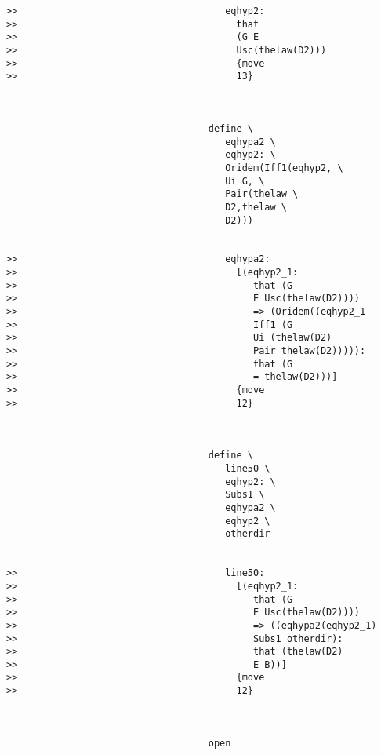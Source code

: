\documentclass[12pt]{article}
\begin{document}
\begin{verbatim}
>>                                     eqhyp2:
>>                                       that
>>                                       (G E
>>                                       Usc(thelaw(D2)))
>>                                       {move
>>                                       13}



                                    define \
                                       eqhypa2 \
                                       eqhyp2: \
                                       Oridem(Iff1(eqhyp2, \
                                       Ui G, \
                                       Pair(thelaw \
                                       D2,thelaw \
                                       D2)))


>>                                     eqhypa2:
>>                                       [(eqhyp2_1:
>>                                          that (G
>>                                          E Usc(thelaw(D2))))
>>                                          => (Oridem((eqhyp2_1
>>                                          Iff1 (G
>>                                          Ui (thelaw(D2)
>>                                          Pair thelaw(D2))))):
>>                                          that (G
>>                                          = thelaw(D2)))]
>>                                       {move
>>                                       12}



                                    define \
                                       line50 \
                                       eqhyp2: \
                                       Subs1 \
                                       eqhypa2 \
                                       eqhyp2 \
                                       otherdir


>>                                     line50:
>>                                       [(eqhyp2_1:
>>                                          that (G
>>                                          E Usc(thelaw(D2))))
>>                                          => ((eqhypa2(eqhyp2_1)
>>                                          Subs1 otherdir):
>>                                          that (thelaw(D2)
>>                                          E B))]
>>                                       {move
>>                                       12}



                                    open



\end{verbatim}
\end{document}
